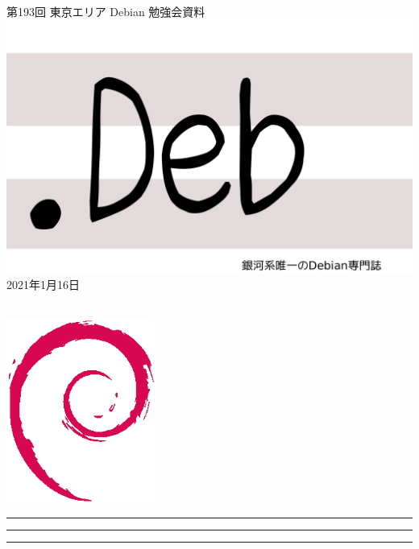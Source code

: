 \documentclass[mingoth,a4paper]{jsarticle}
\newcommand{\debmtgyear}{2021}
\newcommand{\debmtgmonth}{1}
\newcommand{\debmtgdate}{16}
\newcommand{\debmtgnumber}{193}
\begin{document}
\begin{titlepage}
\thispagestyle{empty}

\vspace*{-2cm}
第\debmtgnumber{}回 東京エリア Debian 勉強会資料\\
\hspace*{-2cm}
\includegraphics{image-assets/dotdeb.pdf}\\
\hfill{}\debmtgyear{}年\debmtgmonth{}月\debmtgdate{}日

\\

\vspace*{-2cm}
\hfill{}\includegraphics[height=6cm]{image-assets/openlogo-nd.eps}
\end{titlepage}

\newpage

\begin{minipage}[b]{0.2\hsize}
 \colorbox{titleback}{}
\end{minipage}
\begin{minipage}[b]{0.8\hsize}
\hrule
\vspace{2mm}
\hrule
\begin{multicols}{2}
\tableofcontents
\end{multicols}
\vspace{2mm}
\hrule
\end{minipage}
\end{document}

